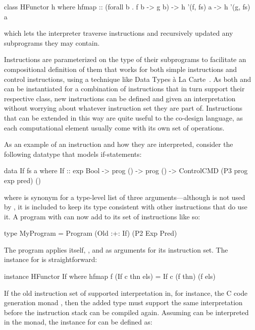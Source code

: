 \documentclass[../paper.tex]{subfiles}
\begin{document}
\begin{code}
class HFunctor h where
  hfmap :: (forall b . f b -> g b) -> h '(f, fs) a -> h '(g, fs) a
\end{code}

\noindent which lets the interpreter traverse instructions and recursively updated any subprograms they may contain.

Instructions are parameterized on the type of their subprograms to facilitate an compositional definition of them that works for both simple instructions and control instructions, using a technique like Data Types \`{a} La Carte~\cite{DTC}. As both  and  can be instantiated for a combination of instructions that in turn support their respective class, new instructions can be defined and given an interpretation without worrying about whatever instruction set they are part of. Instructions that can be extended in this way are quite useful to the co-design language, as each computational element usually come with its own set of operations.

As an example of an instruction and how they are interpreted, consider the following datatype that models if-statements:

\begin{code}
data If fs a where
  If :: exp Bool -> prog () -> prog () -> ControlCMD (P3 prog exp pred) ()
\end{code}

\noindent where  is synonym for a type-level list of three arguments---although  is not used by , it is included to keep its type consistent with other instructions that do use it. A program with can now add  to its set of instructions like so:

\begin{code}
type MyProgram = Program (Old :+: If) (P2 Exp Pred)
\end{code}

\noindent The program applies itself, , and  as arguments for its instruction set. The  instance for  is straightforward:

\begin{code}
instance HFunctor If where
  hfmap f (If c thn els) = If c (f thn) (f els)
\end{code}

If the old instruction set of  supported interpretation in, for instance, the C code generation monad , then the added  type must support the same interpretation before the instruction stack can be compiled again. Assuming  can be interpreted in the  monad, the instance for  can be defined as:
\end{document}
